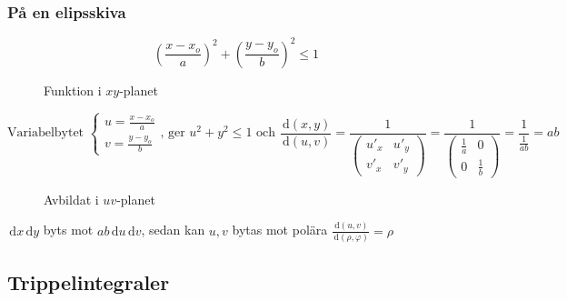 \documentclass[a4paper]{article}
\begin{document}
\newpage
\subsubsection{På en elipsskiva}

$$\left(\frac{x-x_o}{a}\right)^2 + \left(\frac{y-y_o}{b}\right)^2 \leq 1$$

\begin{figure}[ht]
\usetikzlibrary{patterns}
  \caption{Funktion i $xy$-planet} \label{fig:10.1}
\end{figure}

$$
	\text{Variabelbytet }
	\begin{cases}
		u = \frac{x-x_o}{a} \\
		v = \frac{y-y_o}{b}
	\end{cases}
	\text{, ger } u^2+y^2 \leq 1
	\text{ och } \frac{\,\mathrm{d}(x,y)}{\,\mathrm{d}(u,v)} = \frac{1}{
	\begin{pmatrix}
		u'_x & u'_y \\
		v'_x & v'_y
	\end{pmatrix}} = \frac{1}{
	\begin{pmatrix}
		\frac{1}{a} & 0 \\
		0 & \frac{1}{b}
	\end{pmatrix}} = \frac{1}{\frac{1}{ab}} = ab
$$

\begin{figure}[ht]
\usetikzlibrary{patterns}
  \caption{Avbildat i $uv$-planet} \label{fig:10.2}
\end{figure}

$\,\mathrm{d}x\,\mathrm{d}y$ byts mot $ab\,\mathrm{d}u\,\mathrm{d}v$, sedan kan $u,v$ bytas mot polära $\frac{\,\mathrm{d}(u,v)}{\,\mathrm{d}(\rho,\varphi)} = \rho$

\newpage
\subsection{Trippelintegraler}
\end{document}
